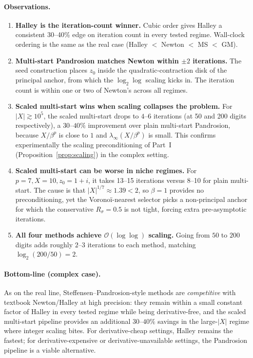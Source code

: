 \documentclass[11pt,a4paper]{article}
\theoremstyle{definition}
\begin{document}
\paragraph{Observations.}
\begin{enumerate}
  \item \textbf{Halley is the iteration-count winner.} Cubic order gives Halley a consistent 30--40\% edge on iteration count in every tested regime. Wall-clock ordering is the same as the real case (Halley $<$ Newton $<$ MS $<$ GM).
  \item \textbf{Multi-start Pandrosion matches Newton within $\pm 2$ iterations.} The seed construction places $z_0$ inside the quadratic-contraction disk of the principal anchor, from which the $\log_2 \log$ scaling kicks in. The iteration count is within one or two of Newton's across all regimes.
  \item \textbf{Scaled multi-start wins when scaling collapses the problem.} For $|X| \gtrsim 10^5$, the scaled multi-start drops to $4$--$6$ iterations (at 50 and 200 digits respectively), a $30$--$40\%$ improvement over plain multi-start Pandrosion, because $X/\beta^p$ is close to $1$ and $\lambda_\infty(X/\beta^p)$ is small. This confirms experimentally the scaling preconditioning of Part~I (Proposition~\ref{prop:scaling}) in the complex setting.
  \item \textbf{Scaled multi-start can be worse in niche regimes.} For $p = 7, X = 10, z_0 = 1+i$, it takes 13--15 iterations versus 8--10 for plain multi-start. The cause is that $|X|^{1/7} \approx 1.39 < 2$, so $\beta = 1$ provides no preconditioning, yet the Voronoï-nearest selector picks a non-principal anchor for which the conservative $R_\sigma = 0.5$ is not tight, forcing extra pre-asymptotic iterations.
  \item \textbf{All four methods achieve $\mathcal{O}(\log\log)$ scaling.} Going from $50$ to $200$ digits adds roughly $2$--$3$ iterations to each method, matching $\log_2(200/50) = 2$.
\end{enumerate}

\paragraph{Bottom-line (complex case).} As on the real line, Steffensen--Pandrosion-style methods are \emph{competitive} with textbook Newton/Halley at high precision: they remain within a small constant factor of Halley in every tested regime while being derivative-free, and the scaled multi-start pipeline provides an additional $30$--$40\%$ savings in the large-$|X|$ regime where integer scaling bites. For derivative-cheap settings, Halley remains the fastest; for derivative-expensive or derivative-unavailable settings, the Pandrosion pipeline is a viable alternative.
\end{document}
